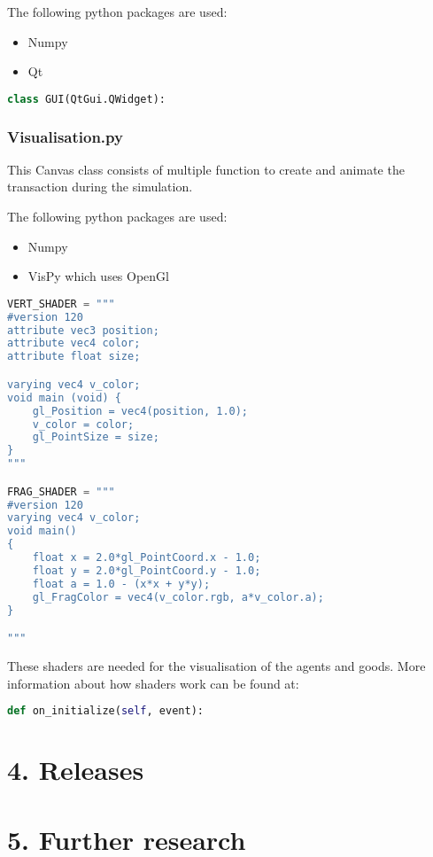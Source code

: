 \documentclass{article}
\begin{document}
The following python packages are used:
\begin{itemize}
  \item Numpy
  \item Qt
\end{itemize}

\begin{lstlisting}[language=Python]
class GUI(QtGui.QWidget):
\end{lstlisting}


\subsubsection{Visualisation.py}
This Canvas class consists of multiple function to create and animate the transaction during the simulation.

The following python packages are used:
\begin{itemize}
  \item Numpy
  \item VisPy which uses OpenGl
\end{itemize}

\begin{lstlisting}[language=Python]
VERT_SHADER = """
#version 120
attribute vec3 position;
attribute vec4 color;
attribute float size;

varying vec4 v_color;
void main (void) {
    gl_Position = vec4(position, 1.0);
    v_color = color;
    gl_PointSize = size;
}
"""

FRAG_SHADER = """
#version 120
varying vec4 v_color;
void main()
{
    float x = 2.0*gl_PointCoord.x - 1.0;
    float y = 2.0*gl_PointCoord.y - 1.0;
    float a = 1.0 - (x*x + y*y);
    gl_FragColor = vec4(v_color.rgb, a*v_color.a);
}

"""
\end{lstlisting}
These shaders are needed for the visualisation of the agents and goods. More information about how shaders work can be found at:

\begin{lstlisting}[language=Python]
def on_initialize(self, event):
\end{lstlisting}


\section{4. Releases}


\section{5. Further research}
\end{document}
